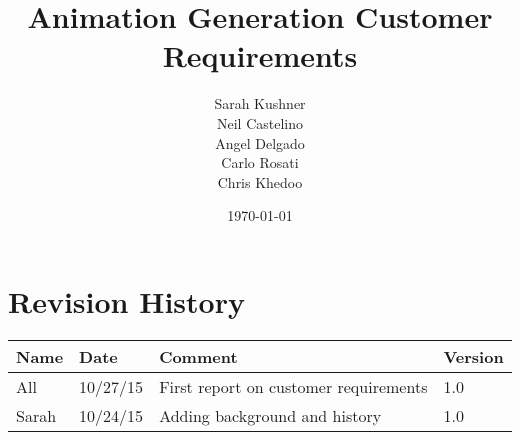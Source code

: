 \documentclass{report}
\begin{document}
\title{Animation Generation Customer Requirements}
\author{Sarah Kushner\\
		Neil Castelino\\
		Angel Delgado\\
		Carlo Rosati\\
		Chris Khedoo}
\date{\today}
\maketitle
\small

\pagebreak
\section{Revision History}
\begin{tabular}{|l|l|l|l|}
\hline
Name	& Date	 		& 	Comment	 								& 	Version	 \\ \hline
All		& 10/27/15		& 	First report on customer requirements	&  	1.0 	 \\ \hline
Sarah		& 10/24/15		& 	Adding background and history	&  	1.0 	 \\ \hline
\end{tabular}

\pagebreak




\end{document}
